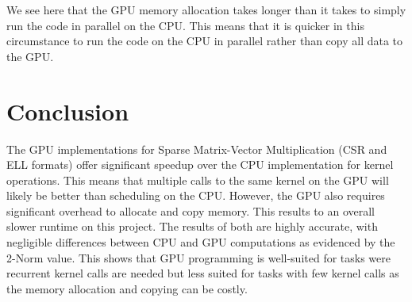 \documentclass{article}
\begin{document}
We see here that the GPU memory allocation takes longer than it takes to simply run the code in parallel on the CPU. This means that it is quicker in this circumstance to run the code on the CPU in parallel rather than copy all data to the GPU. 

\section*{Conclusion}

The GPU implementations for Sparse Matrix-Vector Multiplication (CSR and ELL formats) offer significant speedup over the CPU implementation for kernel operations. This means that multiple calls to the same kernel on the GPU will likely be better than scheduling on the CPU. However, the GPU also requires significant overhead to allocate and copy memory. This results to an overall slower runtime on this project. The results of both are highly accurate, with negligible differences between CPU and GPU computations as evidenced by the 2-Norm value. This shows that GPU programming is well-suited for tasks were recurrent kernel calls are needed but less suited for tasks with few kernel calls as the memory allocation and copying can be costly.
\end{document}

